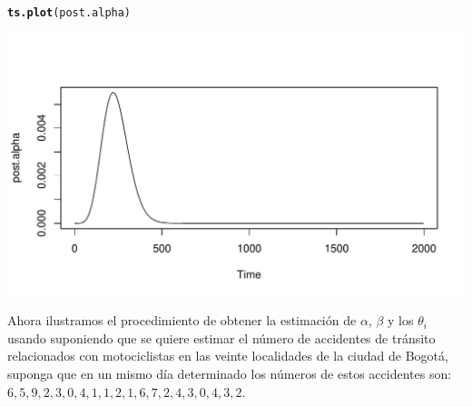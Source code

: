 \documentclass[10pt,openright]{book}\usepackage[]{graphicx}\usepackage[]{color}
\makeatletter
\def\maxwidth{ %
  \ifdim\Gin@nat@width>\linewidth
    \linewidth
  \else
    \Gin@nat@width
  \fi
}
\newcommand{\hlstd}[1]{\textcolor[rgb]{0.345,0.345,0.345}{#1}}%
\newcommand{\hlkwd}[1]{\textcolor[rgb]{0.737,0.353,0.396}{\textbf{#1}}}%
\newenvironment{kframe}{%
 \def\at@end@of@kframe{}%
 \ifinner\ifhmode%
  \def\at@end@of@kframe{\end{minipage}}%
  \begin{minipage}{\columnwidth}%
 \fi\fi%
 \def\FrameCommand##1{\hskip\@totalleftmargin \hskip-\fboxsep
 \colorbox{shadecolor}{##1}\hskip-\fboxsep
     \hskip-\linewidth \hskip-\@totalleftmargin \hskip\columnwidth}%
 \MakeFramed {\advance\hsize-\width
   \@totalleftmargin\z@ \linewidth\hsize
   \@setminipage}}%
 {\par\unskip\endMakeFramed%
 \at@end@of@kframe}
\newenvironment{knitrout}{}{} %
\makeatother
\begin{document}
\begin{knitrout}
\begin{kframe}\begin{alltt}
\hlkwd{ts.plot}\hlstd{(post.alpha)}
\end{alltt}
\end{kframe}
\includegraphics[width=\maxwidth]{figure/unnamed-chunk-73-3} 

\end{knitrout}
Ahora ilustramos el procedimiento de obtener la estimaci\'on de $\alpha$, $\beta$ y los $\theta_i$ usando suponiendo que se quiere estimar el n\'umero de accidentes de tr\'ansito relacionados con motociclistas en las veinte localidades de la ciudad de Bogot\'a, suponga que en un mismo d\'ia determinado los n\'umeros de estos accidentes son: $6, 5, 9, 2, 3, 0, 4, 1, 1, 2, 1, 6, 7, 2, 4, 3, 0, 4, 3, 2$.
\end{document}

